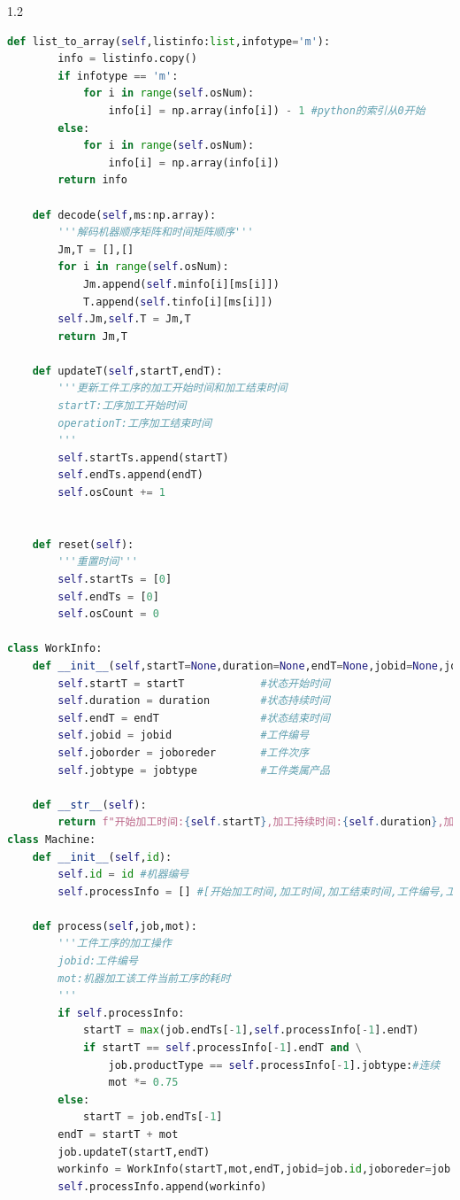 \documentclass{whutmod}
\begin{document}
\begin{spacing}{1.2}
\begin{lstlisting}[language=python]
    def list_to_array(self,listinfo:list,infotype='m'):
        info = listinfo.copy()
        if infotype == 'm':
            for i in range(self.osNum):
                info[i] = np.array(info[i]) - 1 #python的索引从0开始
        else:
            for i in range(self.osNum):
                info[i] = np.array(info[i])
        return info
    
    def decode(self,ms:np.array):
        '''解码机器顺序矩阵和时间矩阵顺序'''
        Jm,T = [],[]
        for i in range(self.osNum):
            Jm.append(self.minfo[i][ms[i]])
            T.append(self.tinfo[i][ms[i]])
        self.Jm,self.T = Jm,T
        return Jm,T
    
    def updateT(self,startT,endT):
        '''更新工件工序的加工开始时间和加工结束时间
        startT:工序加工开始时间
        operationT:工序加工结束时间
        '''
        self.startTs.append(startT)
        self.endTs.append(endT)
        self.osCount += 1


    def reset(self):
        '''重置时间'''
        self.startTs = [0]
        self.endTs = [0]
        self.osCount = 0

class WorkInfo:
    def __init__(self,startT=None,duration=None,endT=None,jobid=None,joboreder=None,jobtype=None):
        self.startT = startT            #状态开始时间
        self.duration = duration        #状态持续时间
        self.endT = endT                #状态结束时间
        self.jobid = jobid              #工件编号
        self.joborder = joboreder       #工件次序
        self.jobtype = jobtype          #工件类属产品
    
    def __str__(self):
        return f"开始加工时间:{self.startT},加工持续时间:{self.duration},加工结束时间:{self.endT},工件编号:{self.jobid},工件次序:{self.joborder},工件类属产品:{self.jobtype}"
class Machine:
    def __init__(self,id):
        self.id = id #机器编号
        self.processInfo = [] #[开始加工时间,加工时间,加工结束时间,工件编号,工件工序号,工件产品类型]

    def process(self,job,mot):
        '''工件工序的加工操作
        jobid:工件编号
        mot:机器加工该工件当前工序的耗时
        '''
        if self.processInfo:
            startT = max(job.endTs[-1],self.processInfo[-1].endT)
            if startT == self.processInfo[-1].endT and \
                job.productType == self.processInfo[-1].jobtype:#连续
                mot *= 0.75
        else:
            startT = job.endTs[-1]
        endT = startT + mot
        job.updateT(startT,endT)    
        workinfo = WorkInfo(startT,mot,endT,jobid=job.id,joboreder=job.osCount,jobtype=job.productType)
        self.processInfo.append(workinfo)
    

\end{lstlisting}
\end{spacing}
\end{document}
